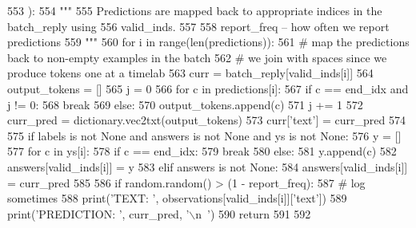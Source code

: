 \begin{DoxyCode}
553     ):
554         \textcolor{stringliteral}{"""}
555 \textcolor{stringliteral}{        Predictions are mapped back to appropriate indices in the batch\_reply using}
556 \textcolor{stringliteral}{        valid\_inds.}
557 \textcolor{stringliteral}{}
558 \textcolor{stringliteral}{        report\_freq -- how often we report predictions}
559 \textcolor{stringliteral}{        """}
560         \textcolor{keywordflow}{for} i \textcolor{keywordflow}{in} range(len(predictions)):
561             \textcolor{comment}{# map the predictions back to non-empty examples in the batch}
562             \textcolor{comment}{# we join with spaces since we produce tokens one at a timelab}
563             curr = batch\_reply[valid\_inds[i]]
564             output\_tokens = []
565             j = 0
566             \textcolor{keywordflow}{for} c \textcolor{keywordflow}{in} predictions[i]:
567                 \textcolor{keywordflow}{if} c == end\_idx \textcolor{keywordflow}{and} j != 0:
568                     \textcolor{keywordflow}{break}
569                 \textcolor{keywordflow}{else}:
570                     output\_tokens.append(c)
571                 j += 1
572             curr\_pred = dictionary.vec2txt(output\_tokens)
573             curr[\textcolor{stringliteral}{'text'}] = curr\_pred
574 
575             \textcolor{keywordflow}{if} labels \textcolor{keywordflow}{is} \textcolor{keywordflow}{not} \textcolor{keywordtype}{None} \textcolor{keywordflow}{and} answers \textcolor{keywordflow}{is} \textcolor{keywordflow}{not} \textcolor{keywordtype}{None} \textcolor{keywordflow}{and} ys \textcolor{keywordflow}{is} \textcolor{keywordflow}{not} \textcolor{keywordtype}{None}:
576                 y = []
577                 \textcolor{keywordflow}{for} c \textcolor{keywordflow}{in} ys[i]:
578                     \textcolor{keywordflow}{if} c == end\_idx:
579                         \textcolor{keywordflow}{break}
580                     \textcolor{keywordflow}{else}:
581                         y.append(c)
582                 answers[valid\_inds[i]] = y
583             \textcolor{keywordflow}{elif} answers \textcolor{keywordflow}{is} \textcolor{keywordflow}{not} \textcolor{keywordtype}{None}:
584                 answers[valid\_inds[i]] = curr\_pred
585 
586             \textcolor{keywordflow}{if} random.random() > (1 - report\_freq):
587                 \textcolor{comment}{# log sometimes}
588                 print(\textcolor{stringliteral}{'TEXT: '}, observations[valid\_inds[i]][\textcolor{stringliteral}{'text'}])
589                 print(\textcolor{stringliteral}{'PREDICTION: '}, curr\_pred, \textcolor{stringliteral}{'\(\backslash\)n~'})
590         \textcolor{keywordflow}{return}
591 
592 
\end{DoxyCode}
